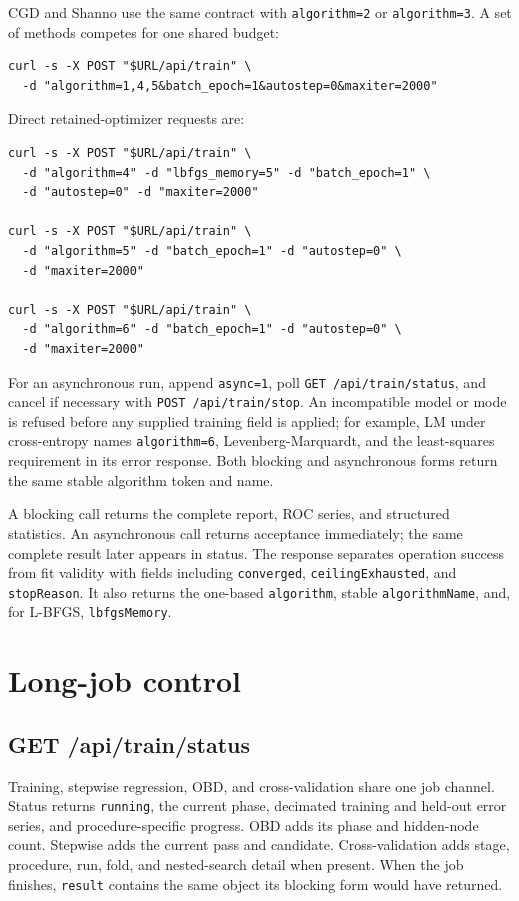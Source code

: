 CGD and Shanno use the same contract with \texttt{algorithm=2} or
\texttt{algorithm=3}. A set of methods competes for one shared budget:
\begin{verbatim}
curl -s -X POST "$URL/api/train" \
  -d "algorithm=1,4,5&batch_epoch=1&autostep=0&maxiter=2000"
\end{verbatim}

Direct retained-optimizer requests are:
\begin{verbatim}
curl -s -X POST "$URL/api/train" \
  -d "algorithm=4" -d "lbfgs_memory=5" -d "batch_epoch=1" \
  -d "autostep=0" -d "maxiter=2000"

curl -s -X POST "$URL/api/train" \
  -d "algorithm=5" -d "batch_epoch=1" -d "autostep=0" \
  -d "maxiter=2000"

curl -s -X POST "$URL/api/train" \
  -d "algorithm=6" -d "batch_epoch=1" -d "autostep=0" \
  -d "maxiter=2000"
\end{verbatim}

For an asynchronous run, append \texttt{async=1}, poll
\texttt{GET /api/train/status}, and cancel if necessary with
\texttt{POST /api/train/stop}. An incompatible model or mode is refused before
any supplied training field is applied; for example, LM under cross-entropy
names \texttt{algorithm=6}, Levenberg-Marquardt, and the least-squares
requirement in its error response. Both blocking and asynchronous forms return
the same stable algorithm token and name.

A blocking call returns the complete report, ROC series, and structured
statistics.  An asynchronous call returns acceptance immediately; the
same complete result later appears in status.  The response separates
operation success from fit validity with fields including
\texttt{converged}, \texttt{ceilingExhausted}, and
\texttt{stopReason}. It also returns the one-based \texttt{algorithm}, stable
\texttt{algorithmName}, and, for L-BFGS, \texttt{lbfgsMemory}.

\section{Long-job control}

\subsection{GET /api/train/status}

Training, stepwise regression, OBD, and cross-validation share one job
channel.  Status returns \texttt{running}, the current phase, decimated
training and held-out error series, and procedure-specific progress.
OBD adds its phase and hidden-node count.  Stepwise adds the current
pass and candidate.  Cross-validation adds stage, procedure, run,
fold, and nested-search detail when present.  When the job finishes,
\texttt{result} contains the same object its blocking form would have
returned.

